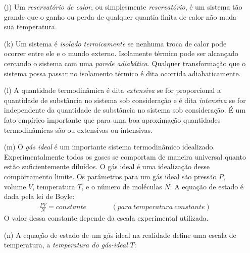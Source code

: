\begin{itemize}
\begin{center}
$\Delta Q=C\Delta T$
\end{center}
A capacidade calor\'ifica depende da natureza detalhada do sistema e \'e dada como parte da especifica\c{c}\~ao do sistema. \'E um fato experimental que, para um mesmo $\Delta T$, $\Delta Q$ \'e diferente para formas diferentes de aquecer o sistema. Da mesma maneira, a capacidade calor\'ifica depende da forma de aquecimento. AS capacidade calor\'ificas comumente consideradas s\~ao $C_{V}$ e $C_{P}$, as quais correspondem respectivamente a um aquecimento a $V$ e $P$ constantes. Capacidade calor\'ificas por unidade de massa ou por mol de uma subst\^ancia s\~ao chamados {\it calores espec\'ificos}.
\item[(j)] Um {\it reservat\'orio de calor}, ou simplesmente {\it reservat\'orio}, \'e um sistema t\~ao grande que o ganho ou perda de qualquer quantia finita de calor n\~ao muda sua temperatura.
\item[(k)] Um sistema \'e {\it isolado termicamente} se nenhuma troca de calor pode ocorrer entre ele e o mundo externo. Isolamente t\'ermico pode ser alcan\c{c}ado cercando o sistema com uma {\it parede adiab\'atica}. Qualquer transforma\c{c}\~ao que o sistema possa passar no isolamento t\'ermico \'e dita ocorrida adiabaticamente.
\item[(l)] A quantidade termodin\^amica \'e dita {\it extensiva} se for proporcional a quantidade de subst\^ancia no sistema sob considera\c{c}\~ao e \'e dita {\it intensiva} se for independente da quantidade de subst\^ancia no sistema sob considera\c{c}\~ao. \'E um fato emp\'irico importante que para uma boa aproxima\c{c}\~ao quantidades termodin\^amicas s\~ao ou extensivas ou intensivas.
\item[(m)] O {\it g\'as ideal} \'e um importante sistema termodin\^amico idealizado. Experimentalmente todos os gases se comportam de maneira universal quanto est\~ao suficientemente dilu\'idos. O g\'as ideal \'e uma idealiza\c{c}\~ao desse comportamento limite. Os par\^ametros para um g\'as ideal s\~ao press\~ao $P$, volume $V$, temperatura $T$, e o n\'umero de mol\'eculas $N$. A equa\c{c}\~ao de estado \'e dada pela lei de Boyle:
\begin{eqnarray*}
\frac{PV}{N}=constante ~~~~~~~~~~~~~~~~ (para~temperatura~constante)
\end{eqnarray*}
O valor dessa constante depende da escala experimental utilizada.
\item[(n)] A equa\c{c}\~ao de estado de um g\'as ideal na realidade define uma escala de temperatura, a {\it temperatura do g\'as-ideal} $T$:

\end{itemize}

